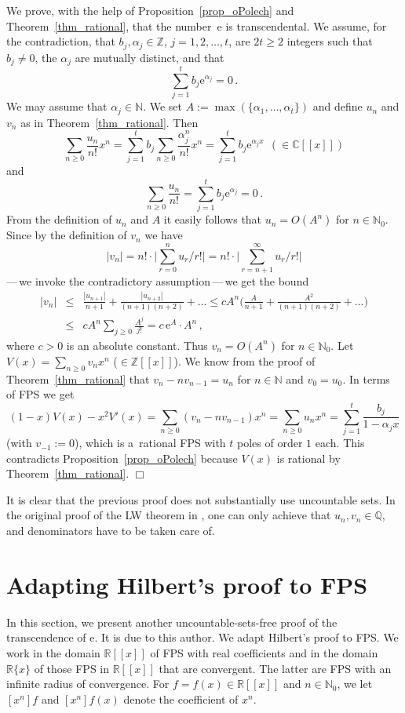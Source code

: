 \documentclass[10pt]{article}
\def\N{\mathbb{N}}
\def\Q{\mathbb{Q}}
\def\Z{\mathbb{Z}}
\def\R{\mathbb{R}}
\def\C{\mathbb{C}}
\def\eproof{\hfill{$\Box$}\bigskip}
\def\ds{\dots}
\def\al{\alpha}
\begin{document}
We prove, with the help of Proposition~\ref{prop_oPolech} and 
Theorem~\ref{thm_rational}, that the number~$\mathrm{e}$ is transcendental. 
We assume, for the contradiction, that $b_j,\al_j\in\Z$, $j=1,2,\ds,t$,
are $2t\ge2$ integers such that
$b_j\ne0$, the $\al_j$ are mutually distinct, and that 
$${\textstyle
\sum_{j=1}^t b_j\mathrm{e}^{\al_j}=0\,.
}
$$
We may assume that $\al_j\in\N$. We set $A:=\max(\{\al_1,\ds,\al_t\})$ and define $u_n$ and $v_n$ as in Theorem~\ref{thm_rational}.  Then
$$
{\textstyle
\sum_{n\ge0}\frac{u_n}{n!}x^n=
\sum_{j=1}^t b_j\sum_{n\ge0}\frac{\al_j^n}{n!}x^n
=\sum_{j=1}^t b_j\mathrm{e}^{\al_jx}\ \ (\in\C[[x]])
}
$$
and
$$
{\textstyle
\sum_{n\ge0}\frac{u_n}{n!}=
\sum_{j=1}^t
b_j\mathrm{e}^{\al_j}=0\,.
}
$$
From the definition of $u_n$ and $A$ it easily follows that $u_n=O(A^n)$ for $n\in\N_0$.
Since by the definition of $v_n$ we have
$$
|v_n|={\textstyle
n!\cdot\big|\sum_{r=0}^n u_r/r!\big|=n!\cdot\big|\sum_{r=n+1}^{\infty}u_r/r!\big|}
$$
---\,we invoke the contradictory assumption\,---\,we get the 
bound 
\begin{eqnarray*}
|v_n|&\le&{\textstyle\frac{|u_{n+1}|}{n+1}+
\frac{|u_{n+2}|}{(n+1)(n+2)}+\ds\le
cA^n\big(
\frac{A}{n+1}+\frac{A^2}{(n+1)(n+2)}+\ds\big)}\\
&\le&{\textstyle cA^n\sum_{j\ge0}\frac{A^j}{j!}=
c\,\mathrm{e}^A\cdot A^n\,,
}
\end{eqnarray*}
where $c>0$ is an absolute constant.
Thus $v_n=O(A^n)$ for $n\in\N_0$.
Let $V(x)=\sum_{n\ge0}v_nx^n$ ($\in\Z[[x]]$). We know from the proof  of Theorem~\ref{thm_rational} that $v_n-nv_{n-1}=u_n$ for $n\in\N$ and $v_0=u_0$. In terms of FPS we get
$${\textstyle
(1-x)V(x)-x^2V'(x)=\sum_{n\ge0}(v_n-nv_{n-1})x^n=\sum_{n\ge0}u_nx^n=
\sum_{j=1}^t\frac{b_j}{1-\al_jx}
}
$$
(with $v_{-1}:=0$), which is a~rational FPS with $t$ poles of 
order $1$ each. This
contradicts Proposition~\ref{prop_oPolech} 
because $V(x)$ 
is rational by Theorem~\ref{thm_rational}.
\eproof

\noindent
It is clear that the previous proof does not substantially use 
uncountable sets. In the original proof of the LW theorem in 
\cite{beuk_al}, one can 
only achieve that $u_n,v_n\in\Q$, and denominators have to be taken care of.


\section{Adapting Hilbert's proof to FPS}\label{sec_klazar}

In this section, we present another uncountable-sets-free 
proof of the transcendence of $\mathrm{e}$. It is due to this 
author. We adapt Hilbert's proof to FPS. We work in the domain $\R[[x]]$ 
of FPS with real coefficients and in the domain $\R\{x\}$ of those FPS in 
$\R[[x]]$ that are convergent. The latter are FPS with an infinite 
radius of convergence. For $f=f(x)\in\R[[x]]$ and $n\in\N_0$, 
we let $[x^n]f$ and $[x^n]f(x)$ denote the coefficient of $x^n$.
\end{document}
